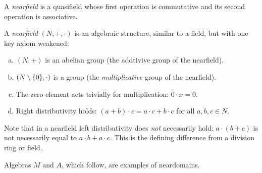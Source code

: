 \begin{defn}
    A \textsl{nearfield} is a quasifield whose first operation is commutative and its second operation is associative.    
\end{defn}
    
\begin{rem}
    A \textsl{nearfield} $(N,+,\cdot)$ is an algebraic structure, similar to a field, but with one key axiom weakened:
    \begin{enumerate}[a)]
        \item $(N, +)$ is an abelian group (the addtivive group of the nearfield).
        \item $(N \setminus\{0\},\cdot)$ is a group (the \textsl{multiplicative} group of the nearfield).
        \item The zero element acts trivially for multiplication: $0\cdot x=0$.
        \item Right distributivity holds: $(a+b)\cdot c= a\cdot c + b\cdot c$ for all $a,b,c\in N$.
    \end{enumerate}
\end{rem}

\begin{rem}
    Note that in a nearfield left distributivity does \textit{not} necessarily hold: $a\cdot(b+c)$ is not necessarily equal to $a\cdot b + a\cdot c$. This is the defining difference from a division ring or field.
\end{rem}

\begin{xmpl}
        Algebras $M$ and $A$, which follow, are examples of neardomains.
\end{xmpl}